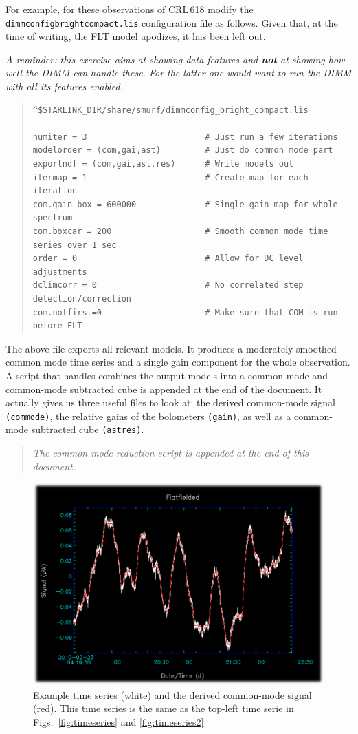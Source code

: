 \documentclass[twoside,11pt]{article}
\renewcommand{\_}{\texttt{\symbol{95}}}
\newenvironment{myquote}{\begin{quote}\begin{small}}{\end{small}\end{quote}}
\begin{document}
For example, for these observations of CRL\,618 modify the
\texttt{dimmconfig\_bright\_compact.lis} configuration file as
follows. Given that, at the time of writing, the FLT model apodizes,
it has been left out.

\emph{A reminder: this exercise aims at showing data features and
\textbf{not} at showing how well the DIMM can handle these. For the
latter one would want to run the DIMM with all its features
enabled.}

\begin{myquote}
\begin{verbatim}
^$STARLINK_DIR/share/smurf/dimmconfig_bright_compact.lis

numiter = 3                        # Just run a few iterations
modelorder = (com,gai,ast)         # Just do common mode part
exportndf = (com,gai,ast,res)      # Write models out
itermap = 1                        # Create map for each iteration
com.gain_box = 600000              # Single gain map for whole spectrum
com.boxcar = 200                   # Smooth common mode time series over 1 sec
order = 0                          # Allow for DC level adjustments
dclimcorr = 0                      # No correlated step detection/correction
com.notfirst=0                     # Make sure that COM is run before FLT
\end{verbatim}
\end{myquote}

The above file exports all relevant models. It produces a moderately
smoothed common mode time series and a single gain component for the
whole observation. A script that handles combines the output models
into a common-mode and common-mode subtracted cube is appended at the
end of the document. It actually gives us three useful files to look
at: the derived common-mode signal \texttt{(\_commode)}, the relative
gains of the bolometers \texttt{(\_gain)}, as well as a common-mode
subtracted cube \texttt{(\_astres)}.

\begin{myquote}
\textsl{The common-mode reduction script is appended at the end of this document.}
\end{myquote}

\begin{figure}[ht]
\begin{center}
\includegraphics[width=0.45\linewidth]{sc19_dimm_common_mode}
\caption{Example time series (white) and the derived
common-mode signal (red).  This time series is the same as the
top-left time serie in Figs.~\ref{fig:timeseries} and \ref{fig:timeseries2}}
\label{fig:dimmcommonmode}
\end{center}
\end{figure}
\end{document}
